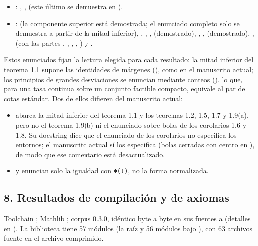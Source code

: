 \documentclass[spanish,11pt,a4paper]{article}
\providecommand{\tightlist}{\setlength{\itemsep}{0pt}\setlength{\parskip}{0pt}}
\begin{document}
\begin{itemize}
\tightlist
\item
  : , ,  (este último se demuestra en ).
\item
  :  (la componente superior está demostrada; el enunciado completo solo se demuestra a partir de la mitad inferior), , , ,  (demostrado), , ,  (demostrado), ,  (con las partes , , , , ) y .
\end{itemize}

Estos enunciados fijan la lectura elegida para cada resultado: la mitad inferior del teorema 1.1 supone las identidades de márgenes (), como en el manuscrito actual; los principios de grandes desviaciones se enuncian mediante conteos (), lo que, para una tasa continua sobre un conjunto factible compacto, equivale al par de cotas estándar. Dos de ellos difieren del manuscrito actual:

\begin{itemize}
\tightlist
\item
   abarca la mitad inferior del teorema 1.1 y los teoremas 1.2, 1.5, 1.7 y 1.9(a), pero no el teorema 1.9(b) ni el enunciado sobre bolas de los corolarios 1.6 y 1.8. Su docstring dice que el enunciado de los corolarios no especifica los entornos; el manuscrito actual sí los especifica (bolas cerradas con centro en ), de modo que ese comentario está desactualizado.
\item
   y  enuncian solo la igualdad con \texttt{Φ(t)}, no la forma normalizada.
\end{itemize}

\subsection{8. Resultados de compilación y de axiomas}\label{resultados-de-compilaciuxf3n-y-de-axiomas}

Toolchain ; Mathlib ; corpus  0.3.0, idéntico byte a byte en sus fuentes a  (detalles en ). La biblioteca  tiene 57 módulos (la raíz  y 56 módulos bajo ), con 63 archivos fuente en el archivo comprimido.
\end{document}
